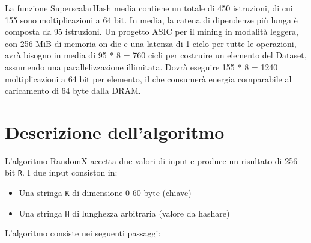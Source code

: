 La funzione SuperscalarHash media contiene un totale di 450 istruzioni, di cui 155 sono moltiplicazioni a 64 bit. In media, la catena di dipendenze più lunga è composta da 95 istruzioni. Un progetto ASIC per il mining in modalità leggera, con 256 MiB di memoria on-die e una latenza di 1 ciclo per tutte le operazioni, avrà bisogno in media di 95 * 8 = 760 cicli per costruire un elemento del Dataset, assumendo una parallelizzazione illimitata. Dovrà eseguire 155 * 8 = 1240 moltiplicazioni a 64 bit per elemento, il che consumerà energia comparabile al caricamento di 64 byte dalla DRAM.



\section{Descrizione dell'algoritmo}

L'algoritmo RandomX accetta due valori di input e produce un risultato di 256 bit \texttt{R}.
I due input consiston in: 

\begin{itemize}
    \item Una stringa \texttt{K} di dimensione 0-60 byte (chiave)
    \item Una stringa \texttt{H} di lunghezza arbitraria (valore da hashare)
\end{itemize}

\noindent
L'algoritmo consiste nei seguenti passaggi:

